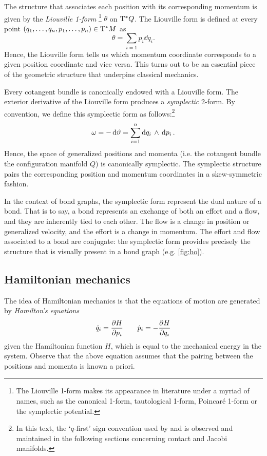 The structure that associates each position with its corresponding momentum is given by the \emph{Liouville 1-form} \footnote
{
    The Liouville 1-form makes its appearance in literature under a myriad of names, such as the canonical 1-form, tautological 1-form, Poincaré 1-form or the symplectic potential.
}
$\theta$ on $\mathrm{T}^*Q$. The Liouville form is defined at every point $ (q_1, \ldots, q_n, p_1, \ldots, p_n) \in \mathrm{T}^*M $ as
\begin{equation}
    \theta = \sum_{i = 1} p_i\dd{q_i}.
\end{equation}
Hence, the Liouville form tells us which momentum coordinate corresponds to a given position coordinate and vice versa. This turns out to be an essential piece of the geometric structure that underpins classical mechanics.

Every cotangent bundle is canonically endowed with a Liouville form. The exterior derivative of the Liouville form produces a \emph{symplectic} 2-form. By convention, we define this symplectic form as follows:\footnote
{
    In this text, the `$q$-first' sign convention used by \citet{Abraham1978} and \citet{Cannas2001} is observed and maintained in the following sections concerning contact and Jacobi manifolds.
}
$$ \omega = -\dd{\vartheta} = \sum_{i = 1}^n  \dd{q_i}\,\wedge\,\dd{p_i} . $$
Hence, the space of generalized positions and momenta (i.e. the cotangent bundle the configuration manifold $Q$) is canonically symplectic. The symplectic structure pairs the corresponding position and momentum coordinates in a skew-symmetric fashion.

In the context of bond graphs, the symplectic form represent the dual nature of a bond. That is to say, a bond represents an exchange of both an effort and a flow, and they are inherently tied to each other. The flow is a change in position or generalized velocity, and the effort is a change in momentum. The effort and flow associated to a bond are conjugate: the symplectic form provides precisely the structure that is visually present in a bond graph (e.g. \cref{fig:ho}).

\subsection{Hamiltonian mechanics}
The idea of Hamiltonian mechanics is that the equations of motion are generated by \emph{Hamilton's equations}
$$ \dot{q}_i = \pdv{H}{p_i} \qquad \dot{p}_i = -\pdv{H}{q_i} $$
given the Hamiltonian function $H$, which is equal to the mechanical energy in the system. Observe that the above equation assumes that the pairing between the positions and momenta is known a priori. 

